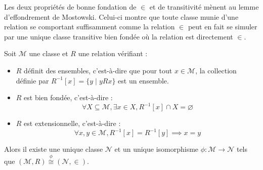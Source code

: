Les deux propriétés de bonne fondation de $\in$ et de transitivité mènent au
lemme d'effondrement de Mostowski. Celui-ci montre que toute classe munie d'une
relation se comportant suffisamment comme la relation $\in$ peut en fait se
simuler par une unique classe transitive bien fondée où la relation est
directement $\in$.

\begin{lemma}\label{lem.most}
  Soit $\mathcal M$ une classe et $R$ une relation vérifiant :
  \begin{itemize}
  \item $R$ définit des ensembles, c'est-à-dire que pour tout $x\in \mathcal M$,
    la collection définie par $R^{-1}[x] = \{y\mid y R x\}$ est un ensemble.
  \item $R$ est bien fondée, c'est-à-dire :
    \[\forall X\subseteq \mathcal M, \exists x \in X, R^{-1}[x]\cap X =
    \varnothing\]
  \item $R$ est extensionnelle, c'est-à-dire :
    \[\forall x,y\in \mathcal M, R^{-1}[x] = R^{-1}[y] \implies x = y\]
  \end{itemize}

  Alors il existe une unique classe $\mathcal N$ et un unique isomorphisme
  $\phi : \mathcal M\to \mathcal N$ tels que
  $(\mathcal M,R) \overset{\phi}{\cong} (\mathcal N,\in)$.
\end{lemma}

